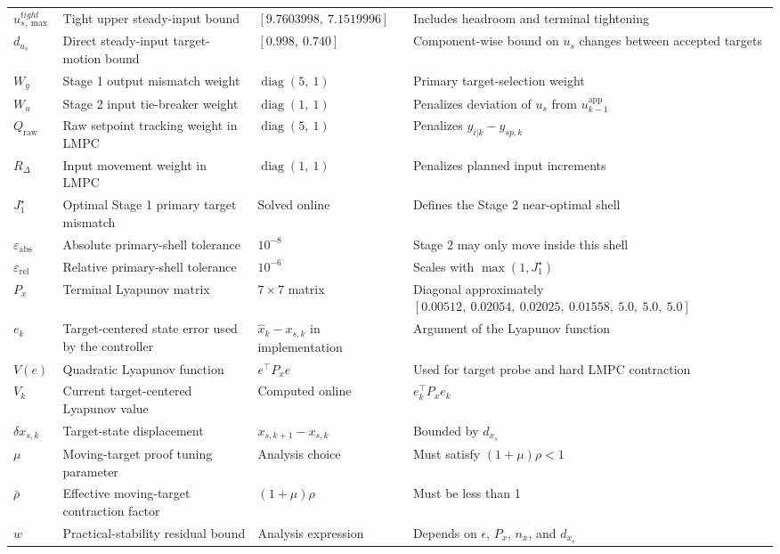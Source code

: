 \documentclass[11pt]{article}
\begin{document}
\begin{longtable}{>{\raggedright\arraybackslash}p{}>{\raggedright\arraybackslash}p{}>{\raggedright\arraybackslash}p{}>{\raggedright\arraybackslash}p{}}
$u_{s,\max}^{tight}$ & Tight upper steady-input bound & $[9.7603998,\ 7.1519996]$ & Includes headroom and terminal tightening \\
$d_{u_s}$ & Direct steady-input target-motion bound & $[0.998,\ 0.740]$ & Component-wise bound on $u_s$ changes between accepted targets \\
$W_y$ & Stage 1 output mismatch weight & $\operatorname{diag}(5,\ 1)$ & Primary target-selection weight \\
$W_u$ & Stage 2 input tie-breaker weight & $\operatorname{diag}(1,\ 1)$ & Penalizes deviation of $u_s$ from $u_{k-1}^{\mathrm{app}}$ \\
$Q_{\mathrm{raw}}$ & Raw setpoint tracking weight in LMPC & $\operatorname{diag}(5,\ 1)$ & Penalizes $y_{i|k}-y_{sp,k}$ \\
$R_{\Delta}$ & Input movement weight in LMPC & $\operatorname{diag}(1,\ 1)$ & Penalizes planned input increments \\
$J_1^\star$ & Optimal Stage 1 primary target mismatch & Solved online & Defines the Stage 2 near-optimal shell \\
$\varepsilon_{\mathrm{abs}}$ & Absolute primary-shell tolerance & $10^{-8}$ & Stage 2 may only move inside this shell \\
$\varepsilon_{\mathrm{rel}}$ & Relative primary-shell tolerance & $10^{-6}$ & Scales with $\max(1,J_1^\star)$ \\
$P_x$ & Terminal Lyapunov matrix & $7\times7$ matrix & Diagonal approximately $[0.00512,\ 0.02054,\ 0.02025,\ 0.01558,\ 5.0,\ 5.0,\ 5.0]$ \\
$e_k$ & Target-centered state error used by the controller & $\hat x_k-x_{s,k}$ in implementation & Argument of the Lyapunov function \\
$V(e)$ & Quadratic Lyapunov function & $e^\top P_x e$ & Used for target probe and hard LMPC contraction \\
$V_k$ & Current target-centered Lyapunov value & Computed online & $e_k^\top P_x e_k$ \\
$\delta x_{s,k}$ & Target-state displacement & $x_{s,k+1}-x_{s,k}$ & Bounded by $d_{x_s}$ \\
$\mu$ & Moving-target proof tuning parameter & Analysis choice & Must satisfy $(1+\mu)\rho<1$ \\
$\bar\rho$ & Effective moving-target contraction factor & $(1+\mu)\rho$ & Must be less than 1 \\
$w$ & Practical-stability residual bound & Analysis expression & Depends on $\epsilon$, $P_x$, $n_x$, and $d_{x_s}$ \\

\end{longtable}
\end{document}
